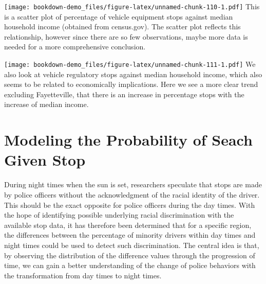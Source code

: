 \documentclass[
]{book}
\newenvironment{Shaded}{\begin{snugshade}}{\end{snugshade}}
\newcommand{\CommentTok}[1]{\textcolor[rgb]{0.56,0.35,0.01}{\textit{#1}}}
\newcommand{\DataTypeTok}[1]{\textcolor[rgb]{0.13,0.29,0.53}{#1}}
\newcommand{\FloatTok}[1]{\textcolor[rgb]{0.00,0.00,0.81}{#1}}
\newcommand{\KeywordTok}[1]{\textcolor[rgb]{0.13,0.29,0.53}{\textbf{#1}}}
\newcommand{\NormalTok}[1]{#1}
\newcommand{\OperatorTok}[1]{\textcolor[rgb]{0.81,0.36,0.00}{\textbf{#1}}}
\newcommand{\StringTok}[1]{\textcolor[rgb]{0.31,0.60,0.02}{#1}}
\begin{document}
\texttt{[image: bookdown-demo\_files/figure-latex/unnamed-chunk-110-1.pdf]}
This is a scatter plot of percentage of vehicle equipment stops against median household income (obtained from census.gov). The scatter plot reflects this relationship, however since there are so few observations, maybe more data is needed for a more comprehensive conclusion.

\begin{Shaded}
\end{Shaded}

\texttt{[image: bookdown-demo\_files/figure-latex/unnamed-chunk-111-1.pdf]}
We also look at vehicle regulatory stops against median household income, which also seems to be related to economically implications. Here we see a more clear trend excluding Fayetteville, that there is an increase in percentage stops with the increase of median income.

\hypertarget{modeling-the-probability-of-seach-given-stop}{%
\section{Modeling the Probability of Seach Given Stop}\label{modeling-the-probability-of-seach-given-stop}}

During night times when the sun is set, researchers speculate that stops are made by police officers without the acknowledgment of the racial identity of the driver. This should be the exact opposite for police officers during the day times. With the hope of identifying possible underlying racial discrimination with the available stop data, it has therefore been determined that for a specific region, the differences between the percentage of minority drivers within day times and night times could be used to detect such discrimination. The central idea is that, by observing the distribution of the difference values through the progression of time, we can gain a better understanding of the change of police behaviors with the transformation from day times to night times.
\end{document}
